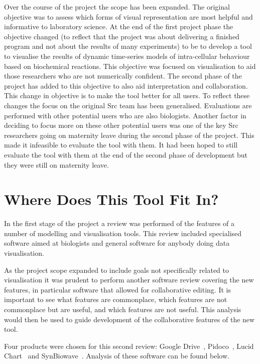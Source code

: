 Over the course of the project the scope has been expanded.  The original objective was to assess which forms of visual representation are most helpful and informative to laboratory science.  At the end of the first project phase the objective changed (to reflect that the project was about delivering a finished program and not about the results of many experiments) to be to develop a tool to visualise the results of dynamic time-series models of intra-cellular behaviour based on biochemical reactions.  This objective was focused on visualisation to aid those researchers who are not numerically confident.  The second phase of the project has added to this objective to also aid interpretation and collaboration.  This change in objective is to make the tool better for all users.  To reflect these changes the focus on the original Src team has been generalised.  Evaluations are performed with other potential users who are also biologists.  Another factor in deciding to focus more on these other potential users was one of the key Src researchers going on maternity leave during the second phase of the project.  This made it infeasible to evaluate the tool with them.  It had been hoped to still evaluate the tool with them at the end of the second phase of development but they were still on maternity leave.

\section{Where Does This Tool Fit In?}
\label{sec:review}

In the first stage of the project a review was performed of the features of a number of modelling and visualisation tools.  This review included specialised software aimed at biologists and general software for anybody doing data visualisation.

As the project scope expanded to include goals not specifically related to visualisation it was prudent to perform another software review covering the new features, in particular software that allowed for collaborative editing.  It is important to see what features are commonplace, which features are not commonplace but are useful, and which features are not useful. This analysis would then be used to guide development of the collaborative features of the new tool.

Four products were chosen for this second review: Google Drive~\cite{g_drive}, Pidoco~\cite{pidoco}, Lucid Chart~\cite{lucid} and SynBiowave~\cite{sbw}.  Analysis of these software can be found below.

